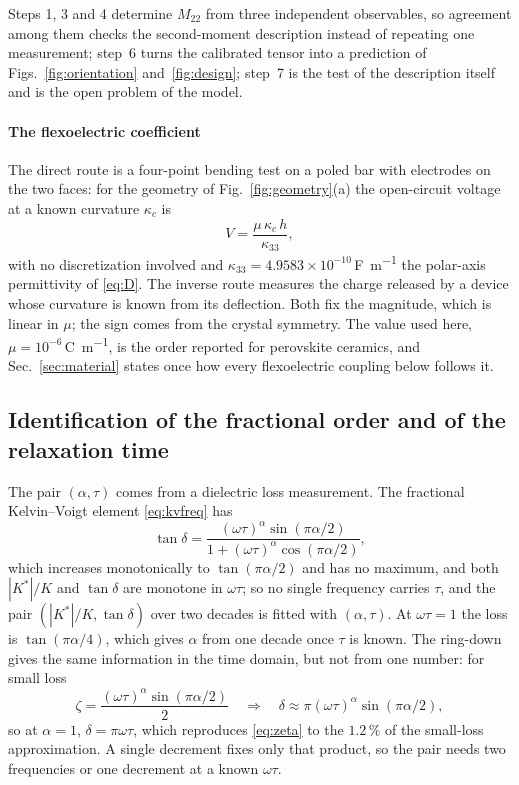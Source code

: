 Steps 1, 3 and 4 determine $M_{22}$ from three independent observables, so
agreement among them checks the second-moment description instead of repeating
one measurement; step~6 turns the calibrated tensor into a prediction of
Figs.~\ref{fig:orientation} and~\ref{fig:design}; step~7 is the test of the
description itself and is the open problem of the model.

\paragraph{The flexoelectric coefficient} The direct route is a four-point
bending test on a poled bar with electrodes on the two faces: for the geometry
of Fig.~\ref{fig:geometry}(a) the open-circuit voltage at a known curvature
$\kappa_{c}$ is
\begin{equation}
  V = \frac{\mu\,\kappa_{c}\,h}{\kappa_{33}},
  \label{eq:muV}
\end{equation}
with no discretization involved and $\kappa_{33}=4.9583\times10^{-10}$\,\si{
\farad\per\metre} the polar-axis permittivity of \eqref{eq:D}. The inverse route
measures the charge released by a device whose curvature is known from its
deflection. Both fix the magnitude, which is linear in $\mu$; the sign comes
from the crystal symmetry. The value used here,
$\mu=10^{-6}$\,\si{\coulomb\per\metre}, is the order reported for perovskite
ceramics, and Sec.~\ref{sec:material} states once how every flexoelectric
coupling below follows it.

\FloatBarrier
\subsection{Identification of the fractional order and of the relaxation time}
\label{sec:calib_alpha_tau}

The pair $(\alpha,\tau)$ comes from a dielectric loss measurement. The
fractional Kelvin--Voigt element \eqref{eq:kvfreq} has
\begin{equation}
  \tan\delta=\frac{(\omega\tau)^{\alpha}\sin(\pi\alpha/2)}
     {1+(\omega\tau)^{\alpha}\cos(\pi\alpha/2)},
  \label{eq:tandelta}
\end{equation}
which increases monotonically to $\tan(\pi\alpha/2)$ and has no maximum, and
both $|K^{*}|/K$ and $\tan\delta$ are monotone in $\omega\tau$; so no single
frequency carries $\tau$, and the pair $(|K^{*}|/K,\tan\delta)$ over two
decades is fitted with $(\alpha,\tau)$. At $\omega\tau=1$ the loss is
$\tan(\pi\alpha/4)$, which gives $\alpha$ from one decade once $\tau$ is known.
The ring-down gives the same information in the time domain, but not from one
number: for small loss
\begin{equation}
  \zeta=\frac{(\omega\tau)^{\alpha}\sin(\pi\alpha/2)}{2}
  \quad\Longrightarrow\quad
  \delta\approx\pi(\omega\tau)^{\alpha}\sin(\pi\alpha/2),
  \label{eq:zetasmall}
\end{equation}
so at $\alpha=1$, $\delta=\pi\omega\tau$, which reproduces \eqref{eq:zeta} to
the $1.2\,\%$ of the small-loss approximation. A single decrement fixes only
that product, so the pair needs two frequencies or one decrement at a known
$\omega\tau$.

